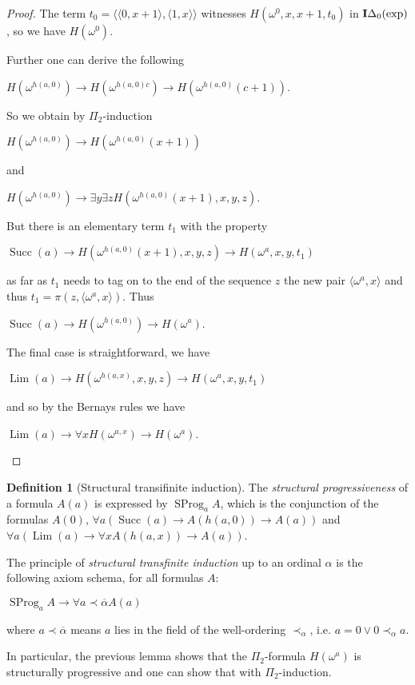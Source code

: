\documentclass[8pt]{article}
\theoremstyle{definition}
\newtheorem{definition}{Definition}[section]
\theoremstyle{definition}
\theoremstyle{definition}
\theoremstyle{definition}
\theoremstyle{definition}
\theoremstyle{definition}
\theoremstyle{definition}
\theoremstyle{definition}
\theoremstyle{definition}
\theoremstyle{definition}
\theoremstyle{definition}
\theoremstyle{definition}
\theoremstyle{definition}
\theoremstyle{question}
\begin{document}
\begin{proof}
  The term $t_0 = \langle \langle 0, x + 1 \rangle, \langle 1, x \rangle \rangle$
  witnesses $H(\omega^0, x, x + 1, t_0)$ in ${\bf I}\Delta_0(\operatorname{exp})$, so we have $H(\omega^0)$.

  Further one can derive the following
  \begin{center}
    $H(\omega^{h(a, 0)}) \to H(\omega^{h(a, 0)c}) \to H(\omega^{h(a, 0)}(c + 1))$.
  \end{center}

  So we obtain by $\Pi_2$-induction
  \begin{center}
    $H(\omega^{h(a, 0)}) \to H(\omega^{h(a, 0)}(x + 1))$
  \end{center}
  and
  \begin{center}
    $H(\omega^{h(a, 0)}) \to \exists y \exists z H(\omega^{h(a, 0)}(x + 1), x,y,z)$.
  \end{center}
  But there is an elementary term $t_1$ with the property
  \begin{center}
    $\operatorname{Succ}(a) \to H(\omega^{h(a, 0)}(x + 1), x, y, z) \to H(\omega^a, x, y, t_1)$
  \end{center}
  as far as $t_1$ needs to tag on to the end of the sequence $z$ the new pair $\langle \omega^a, x \rangle$
  and thus $t_1 = \pi (z, \langle \omega^a, x \rangle)$. Thus
  \begin{center}
    $\operatorname{Succ}(a) \to H(\omega^{h(a, 0)}) \to H(\omega^a)$.
  \end{center}
  The final case is straightforward, we have
  \begin{center}
    $\operatorname{Lim}(a) \to H(\omega^{h(a, x)}, x, y, z) \to H(\omega^a, x, y, t_1)$
  \end{center}
  and so by the Bernays rules we have
  \begin{center}
    $\operatorname{Lim}(a) \to \forall x H(\omega^{a, x}) \to H(\omega^a)$.
  \end{center}
\end{proof}

\begin{definition}[Structural transifinite induction]

  The \emph{structural progressiveness} of a formula $A(a)$ is expressed by $\operatorname{SProg}_a A$, which
  is the conjunction of the formulas $A(0)$, $\forall a (\operatorname{Succ}(a) \to A(h(a, 0)) \to A(a))$ and
  $\forall a (\operatorname{Lim}(a) \to \forall x A(h(a, x)) \to A(a))$.

  The principle of \emph{structural transfinite induction} up to an ordinal $\alpha$ is the following axiom schema, for
  all formulas $A$:
  \begin{center}
    $\operatorname{SProg}_a A \to \forall a \prec \overline{\alpha} A(a)$
  \end{center}
  where $a \prec \overline{\alpha}$ means $a$ lies in the field of the well-ordering $\prec_{\alpha}$, i.e.
  $a = 0 \lor 0 \prec_{\alpha} a$.
\end{definition}
In particular, the previous lemma shows that the $\Pi_2$-formula $H(\omega^a)$ is structurally progressive
and one can show that with $\Pi_2$-induction.
\end{document}
